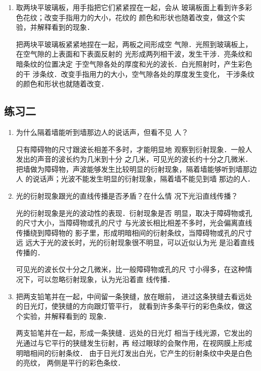 \begin{enumerate}
\item 取两块平玻璃板，用手指把它们紧紧捏在一起，会从
玻璃板面上看到许多彩色花纹；改变手指用力的大小，花纹的
颜色和形状也随着改变，做这个实验，并解释看到的现象．


\begin{solution}
把两块平玻璃板紧紧地捏在一起，两板之间形成空
气隙．光照到玻璃板上，在空气隙的上表面和下表面反射的
光形成两列相干波，发生干涉．亮条纹和暗条纹的位置决定
于空气隙各处的厚度和光的波长．白光照射时，产生彩色的干
涉条纹．改变手指用力的大小，空气隙各处的厚度发生变化，
干涉条纹的颜色和形状也就随着改变．
\end{solution}

\end{enumerate}


\subsection{练习二}
\begin{enumerate}
\item 为什么隔着墙能听到墙那边人的说话声，但看不见
人？

\begin{solution}
    只有障碍物的尺寸跟波长相差不多时，才能明显地
    观察到衍射现象．一般人发出的声音的波长约为几米到十分
    之几米，可见光的波长约十分之几微米．把墙做为障碍物，声波能够发生比较明显的衍射现象，隔着墙能够听到墙那边人
    的说话声；光波不能发生明显的衍射现象，隔着墙不能见到墙
    那边的人．
\end{solution}
\item 光的衍射现象跟光的直线传播是否矛盾？在什么情
况下光沿直线传播？

\begin{solution}
    光的衍射现象是光的波动性的表现．衍射现象是否
    明显，取决于障碍物或孔的尺寸大小，当障碍物或孔的尺寸
    与光波长相比相差不多时，光会偏离直线传播绕到障碍物的
    影子里，形成明暗相间的衍射条纹，当障碍物或孔的尺寸远
    远大于光的波长时，光的衍射现象很不明显，可以近似认为光
    是沿着直线传播的．

    可见光的波长仅十分之几微米，比一般障碍物或孔的尺
    寸小得多，在这种情况下，可以忽略衍射现象，认为光沿着直
    线传播．
\end{solution}
\item 把两支铅笔并在一起，中间留一条狭缝，放在眼前，
进过这条狭缝去看远处的日光灯，使狭缝的方向跟灯管平行，
就看到许多条平行的彩色条纹，做这个实验，并解释看到的
现象．

\begin{solution}
    两支铅笔并在一起，形成一条狭缝．远处的日光灯
    相当于线光源，它发出的光通过与它平行的狭缝发生衍射，再
    经过眼球的会聚作用，在视网膜上形成明暗相间的衍射条纹．
    由于日光灯发出白光，它产生的衍射条纹中央是白色的亮纹，
    两侧是平行的彩色条纹．
\end{solution}
\end{enumerate}



